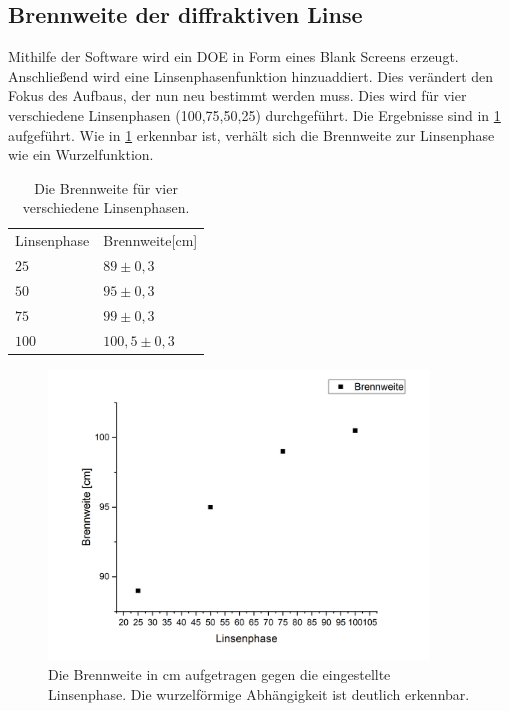 \subsection{Brennweite der diffraktiven Linse}
Mithilfe der Software wird ein DOE in Form eines Blank Screens erzeugt. Anschließend wird eine Linsenphasenfunktion hinzuaddiert. Dies verändert den Fokus des Aufbaus, der nun neu bestimmt werden muss. Dies wird für vier verschiedene Linsenphasen (100,75,50,25) durchgeführt. Die Ergebnisse sind in \cref{tab} aufgeführt. Wie in \cref{linsenphase} erkennbar ist, verhält sich die Brennweite zur Linsenphase wie ein Wurzelfunktion.

\begin{table}[h]
	\caption{Die Brennweite für vier verschiedene Linsenphasen.}
	\begin{tabular}{ll}
		Linsenphase & Brennweite[cm]\\
		$25$ & $89\pm0,3$\\
		$50$ & $95\pm0,3$\\
		$75$ & $99\pm0,3$\\
		$100$ & $100,5\pm0,3$
	\end{tabular}
	\label{tab}
\end{table}

\begin{figure}
	\centering
	\includegraphics[width=0.9\textwidth]{linsenphase.png}
	\caption{Die Brennweite in cm aufgetragen gegen die eingestellte Linsenphase. Die wurzelförmige Abhängigkeit ist deutlich erkennbar.}
	\label{linsenphase}
\end{figure}

